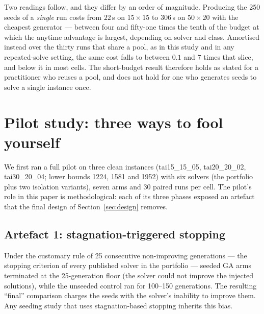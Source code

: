 \documentclass[review]{elsarticle}
\begin{document}
Two readings follow, and they differ by an order of magnitude. Producing the
250 seeds of a \emph{single} run costs from $22$\,s on $15\times15$ to
$306$\,s on $50\times20$ with the cheapest generator --- between four and
fifty-one times the tenth of the budget at which the anytime advantage is
largest, depending on solver and class. Amortised instead over the thirty
runs that share a pool, as in this study and in any repeated-solve setting,
the same cost falls to between $0.1$ and $7$ times that slice, and below it
in most cells. The short-budget result therefore holds as stated for a
practitioner who reuses a pool, and does not hold for one who generates
seeds to solve a single instance once.

\section{Pilot study: three ways to fool yourself}\label{sec:pilot}

We first ran a full pilot on three clean instances
(tai15\_15\_05, tai20\_20\_02, tai30\_20\_04; lower bounds 1224, 1581 and 1952) with six solvers (the portfolio plus two isolation variants), seven
arms and 30 paired runs per cell. The pilot's role in this paper is
methodological: each of its three phases exposed an artefact that the final
design of Section~\ref{sec:design} removes.

\subsection{Artefact 1: stagnation-triggered stopping}
Under the customary rule of 25 consecutive non-improving generations ---
the stopping criterion of every published solver in the portfolio ---
seeded GA arms terminated at the 25-generation floor (the solver could not
improve the injected solutions), while the unseeded control ran for
100--150 generations. The resulting ``final'' comparison charges the seeds
with the solver's inability to improve them. Any seeding study that uses
stagnation-based stopping inherits this bias.
\end{document}
